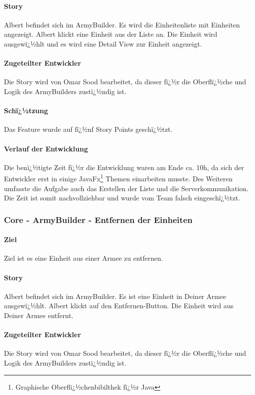 \documentclass[12pt, titlepage]{scrartcl}
\begin{document}
		\paragraph{Story} Albert befindet sich im ArmyBuilder. Es wird die Einheitenliste mit Einheiten angezeigt. Albert klickt eine Einheit aus der Liste an. Die Einheit wird ausgewï¿½hlt und es wird eine Detail View zur Einheit angezeigt.
		\paragraph{Zugeteilter Entwickler} Die Story wird von Omar Sood bearbeitet, da dieser fï¿½r die Oberflï¿½che und Logik des ArmyBuilders zustï¿½ndig ist.
		\paragraph{Schï¿½tzung}
		Das Feature wurde auf fï¿½nf Story Points geschï¿½tzt.
		\paragraph{Verlauf der Entwicklung} Die benï¿½tigte Zeit fï¿½r die Entwicklung waren am Ende ca. 10h, da sich der Entwickler erst in einige JavaFx\footnote{Graphische Oberflï¿½chenbibilthek fï¿½r Java} Themen einarbeiten musste. Des Weiteren umfasste die Aufgabe auch das Erstellen der Liste und die Serverkommunikation. Die Zeit ist somit nachvollziehbar und wurde vom Team falsch eingeschï¿½tzt.
		
		\subsubsection{Core - ArmyBuilder - Entfernen der Einheiten}
		\paragraph{Ziel} Ziel ist es eine Einheit aus einer Armee zu entfernen.
		\paragraph{Story} Albert befindet sich im ArmyBuilder. Es ist eine Einheit in \glqq Deiner Armee \grqq ausgewï¿½hlt. Albert klickt auf den Entfernen-Button. Die Einheit wird aus \glqq Deiner Armee \grqq entfernt.
		\paragraph{Zugeteilter Entwickler} Die Story wird von Omar Sood bearbeitet, da dieser fï¿½r die Oberflï¿½che und Logik des ArmyBuilders zustï¿½ndig ist.
\end{document}
